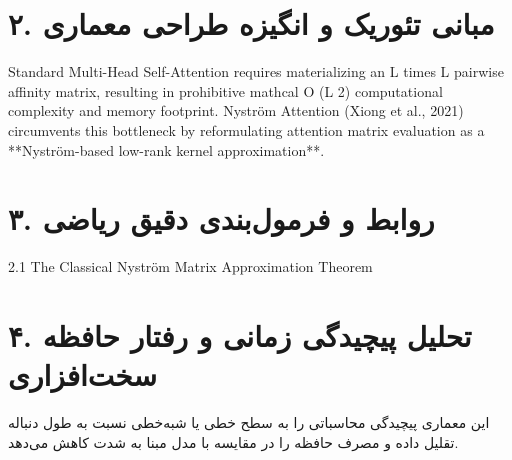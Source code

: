 \documentclass[12pt,a4paper]{article}
\begin{document}
\section*{۲. مبانی تئوریک و انگیزه طراحی معماری}
Standard Multi-Head Self-Attention requires materializing an L times L pairwise affinity matrix, resulting in prohibitive mathcal O (L 2) computational complexity and memory footprint. Nyström Attention (Xiong et al., 2021) circumvents this bottleneck by reformulating attention matrix evaluation as a **Nyström-based low-rank kernel approximation**.

\section*{۳. روابط و فرمول‌بندی دقیق ریاضی}
2.1 The Classical Nyström Matrix Approximation Theorem

\section*{۴. تحلیل پیچیدگی زمانی و رفتار حافظه سخت‌افزاری}
این معماری پیچیدگی محاسباتی را به سطح خطی یا شبه‌خطی نسبت به طول دنباله تقلیل داده و مصرف حافظه را در مقایسه با مدل مبنا به شدت کاهش می‌دهد.
\end{document}
